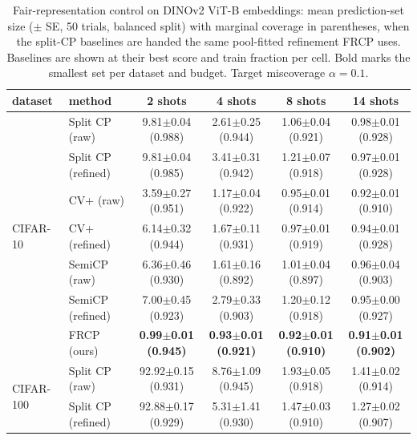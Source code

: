 \begin{table}[t]
\centering
\small
\setlength{\tabcolsep}{4pt}
\caption{Fair-representation control on DINOv2 ViT-B embeddings: mean prediction-set size ($\pm$ SE, 50 trials, balanced split) with marginal coverage in parentheses, when the split-CP baselines are handed the same pool-fitted refinement FRCP uses. Baselines are shown at their best score and train fraction per cell. Bold marks the smallest set per dataset and budget. Target miscoverage $\alpha=0.1$.}
\label{tab:refined-baselines-dinov2-a01}
\begin{tabular}{llcccc}
\toprule
dataset & method & 2 shots & 4 shots & 8 shots & 14 shots\\
\midrule
\multirow{7}{*}{CIFAR-10} & Split CP (raw) & 9.81$\pm$0.04 {\scriptsize(0.988)} & 2.61$\pm$0.25 {\scriptsize(0.944)} & 1.06$\pm$0.04 {\scriptsize(0.921)} & 0.98$\pm$0.01 {\scriptsize(0.928)}\\
 & Split CP (refined) & 9.81$\pm$0.04 {\scriptsize(0.985)} & 3.41$\pm$0.31 {\scriptsize(0.942)} & 1.21$\pm$0.07 {\scriptsize(0.918)} & 0.97$\pm$0.01 {\scriptsize(0.928)}\\
 & CV+ (raw) & 3.59$\pm$0.27 {\scriptsize(0.951)} & 1.17$\pm$0.04 {\scriptsize(0.922)} & 0.95$\pm$0.01 {\scriptsize(0.914)} & 0.92$\pm$0.01 {\scriptsize(0.910)}\\
 & CV+ (refined) & 6.14$\pm$0.32 {\scriptsize(0.944)} & 1.67$\pm$0.11 {\scriptsize(0.931)} & 0.97$\pm$0.01 {\scriptsize(0.919)} & 0.94$\pm$0.01 {\scriptsize(0.928)}\\
 & SemiCP (raw) & 6.36$\pm$0.46 {\scriptsize(0.930)} & 1.61$\pm$0.16 {\scriptsize(0.892)} & 1.01$\pm$0.04 {\scriptsize(0.897)} & 0.96$\pm$0.04 {\scriptsize(0.903)}\\
 & SemiCP (refined) & 7.00$\pm$0.45 {\scriptsize(0.923)} & 2.79$\pm$0.33 {\scriptsize(0.903)} & 1.20$\pm$0.12 {\scriptsize(0.918)} & 0.95$\pm$0.00 {\scriptsize(0.927)}\\
 & FRCP (ours) & \textbf{0.99$\pm$0.01 {\scriptsize(0.945)}} & \textbf{0.93$\pm$0.01 {\scriptsize(0.921)}} & \textbf{0.92$\pm$0.01 {\scriptsize(0.910)}} & \textbf{0.91$\pm$0.01 {\scriptsize(0.902)}}\\
\midrule
\multirow{7}{*}{CIFAR-100} & Split CP (raw) & 92.92$\pm$0.15 {\scriptsize(0.931)} & 8.76$\pm$1.09 {\scriptsize(0.945)} & 1.93$\pm$0.05 {\scriptsize(0.918)} & 1.41$\pm$0.02 {\scriptsize(0.914)}\\
 & Split CP (refined) & 92.88$\pm$0.17 {\scriptsize(0.929)} & 5.31$\pm$1.41 {\scriptsize(0.930)} & 1.47$\pm$0.03 {\scriptsize(0.910)} & 1.27$\pm$0.02 {\scriptsize(0.907)}\\

\end{tabular}
\end{table}
